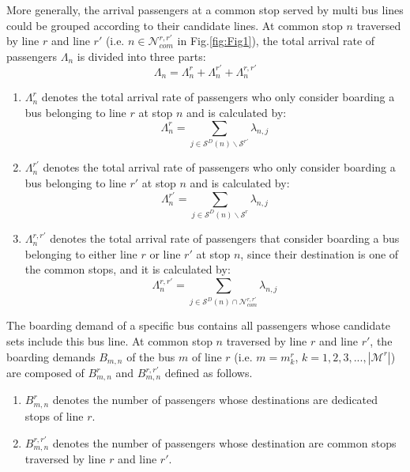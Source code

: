 \documentclass[smallextended]{svjour3}       %
\begin{document}
\begin{Abstract}
More generally, the arrival passengers at a common stop served by multi bus lines could be grouped according to their candidate lines.
At common stop $n$ traversed by line $r$ and line $r'$ (i.e. $n\in \mathcal{N}_{com}^{r,r'}$ in Fig.\ref{fig:Fig1}), 
the total arrival rate of passengers $\Lambda_{n}$ is divided into three parts:
\begin{equation}
    \label{equ:catlambda}
    \Lambda_{n} = \Lambda_{n}^{r} + \Lambda_{n}^{r'} + \Lambda_{n}^{r,r'}
\end{equation}

\begin{enumerate}[1)]
  \item $\Lambda_{n}^{r}$ denotes the total arrival rate of passengers 
  who only consider boarding a bus belonging to line $r$ at stop $n$ and is calculated by:
  \begin{equation}
      \Lambda_{n}^{r} = \sum_{j \in \mathcal{S}^{D}(n)\backslash\mathcal{S}^{r'}} \lambda_{n,j}
  \end{equation}
  \item $\Lambda_{n}^{r'}$ denotes the total arrival rate of passengers 
  who only consider boarding a bus belonging to line $r'$ at stop $n$ and is calculated by:
  \begin{equation}
      \Lambda_{n}^{r'} = \sum_{j \in \mathcal{S}^{D}(n)\backslash\mathcal{S}^{r}} \lambda_{n,j}
  \end{equation}
  \item $\Lambda_{n}^{r,r'}$ denotes the total arrival rate of passengers that consider boarding a bus belonging to either line $r$ or line $r'$ at stop $n$,
  since their destination is one of the common stops, and it is calculated by:
  \begin{equation}
      \Lambda_{n}^{r,r'} = \sum_{j \in \mathcal{S}^{D}\left(n\right) \cap \mathcal{N}_{com}^{r,r'}} \lambda_{n,j}
  \end{equation}
\end{enumerate}

The boarding demand of a specific bus contains all passengers whose candidate sets include this bus line.
At common stop $n$ traversed by line $r$ and line $r'$, 
the boarding demands $B_{m,n}$ of the bus $m$ of line $r$ (i.e. $m=m^{r}_{k}$, $k=1,2,3,...,\left|\mathcal{M}^{r}\right|$) 
are composed of $B_{m,n}^{r}$ and $B_{m,n}^{r,r'}$ defined as follows.
\begin{enumerate}[1)]
    \item $B_{m,n}^{r}$ denotes the number of passengers whose destinations are dedicated stops of line $r$. 
    \item $B_{m,n}^{r,r'}$ denotes the number of passengers whose destination are common stops traversed by line $r$ and line $r'$. 
\end{enumerate}


\end{Abstract}
\end{document}
